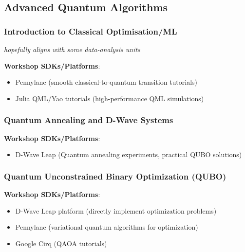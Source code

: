 \subsection{Advanced Quantum Algorithms}
	
	
\subsubsection{Introduction to Classical Optimisation/ML}

\emph{hopefully aligns with some data-analysis units}

\textbf{Workshop SDKs/Platforms}:

\begin{itemize}
	\item Pennylane (smooth classical-to-quantum transition tutorials)
	\item Julia QML/Yao tutorials (high-performance QML simulations)
\end{itemize}


\subsubsection{Quantum Annealing and D-Wave Systems}
	
\textbf{Workshop SDKs/Platforms}:

\begin{itemize}
	\item D-Wave Leap (Quantum annealing experiments, practical QUBO solutions)
\end{itemize}


\subsubsection{Quantum Unconstrained Binary Optimization (QUBO)}
	
\textbf{Workshop SDKs/Platforms}:

\begin{itemize}
	\item D-Wave Leap platform (directly implement optimization problems)
	\item Pennylane (variational quantum algorithms for optimization)
	\item Google Cirq (QAOA tutorials)
\end{itemize}


